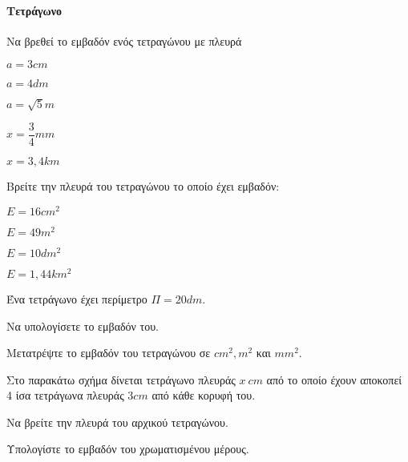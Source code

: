 \documentclass[11pt,a4paper,modern]{FFExercises}
\begin{document}
\paragraph{Τετράγωνο}
\askhsh Να βρεθεί το εμβαδόν ενός τετραγώνου με πλευρά
\begin{multicols}{2}
\begin{alist}
\item $a=3\si{cm}$
\item $a=4\si{dm}$
\item $a=\sqrt{5}\si{m}$
\item $x=\dfrac{3}{4}\si{mm}$
\item $x=3{,}4\si{km}$
\end{alist}
\end{multicols}
\askhsh Βρείτε την πλευρά του τετραγώνου το οποίο έχει εμβαδόν:
\begin{multicols}{2}
\begin{alist}
\item $E=16\si{cm^2}$
\item $E=49\si{m^2}$
\item $E=10\si{dm^2}$
\item $E=1{,}44\si{km^2}$
\end{alist}
\end{multicols}
\askhsh Ένα τετράγωνο έχει περίμετρο $\Pi=20\si{dm}$.
\begin{alist}
\item Να υπολογίσετε το εμβαδόν του.
\item Μετατρέψτε το εμβαδόν του τετραγώνου σε $\si{cm^2},\si{m^2}$ και $\si{mm^2}$.
\end{alist}
\askhsh Στο παρακάτω σχήμα δίνεται τετράγωνο πλευράς $x\ \si{cm}$ από το οποίο έχουν αποκοπεί 4 ίσα τετράγωνα πλευράς $3\si{cm}$ από κάθε κορυφή του.
\begin{center}
\end{center}
\begin{alist}
\item Να βρείτε την πλευρά του αρχικού τετραγώνου.
\item Υπολογίστε το εμβαδόν του χρωματισμένου μέρους.
\end{alist}
\end{document}
